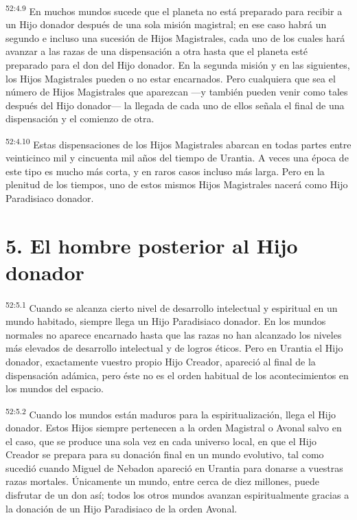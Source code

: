 \par
\textsuperscript{52:4.9} En muchos mundos sucede que el planeta no está preparado para recibir a un Hijo donador después de una sola misión magistral; en ese caso habrá un segundo e incluso una sucesión de Hijos Magistrales, cada uno de los cuales hará avanzar a las razas de una dispensación a otra hasta que el planeta esté preparado para el don del Hijo donador. En la segunda misión y en las siguientes, los Hijos Magistrales pueden o no estar encarnados. Pero cualquiera que sea el número de Hijos Magistrales que aparezcan ---y también pueden venir como tales después del Hijo donador--- la llegada de cada uno de ellos señala el final de una dispensación y el comienzo de otra.

\par
\textsuperscript{52:4.10} Estas dispensaciones de los Hijos Magistrales abarcan en todas partes entre veinticinco mil y cincuenta mil años del tiempo de Urantia. A veces una época de este tipo es mucho más corta, y en raros casos incluso más larga. Pero en la plenitud de los tiempos, uno de estos mismos Hijos Magistrales nacerá como Hijo Paradisiaco donador.

\section*{5. El hombre posterior al Hijo donador}
\par
\textsuperscript{52:5.1} Cuando se alcanza cierto nivel de desarrollo intelectual y espiritual en un mundo habitado, siempre llega un Hijo Paradisiaco donador. En los mundos normales no aparece encarnado hasta que las razas no han alcanzado los niveles más elevados de desarrollo intelectual y de logros éticos. Pero en Urantia el Hijo donador, exactamente vuestro propio Hijo Creador, apareció al final de la dispensación adámica, pero éste no es el orden habitual de los acontecimientos en los mundos del espacio.

\par
\textsuperscript{52:5.2} Cuando los mundos están maduros para la espiritualización, llega el Hijo donador. Estos Hijos siempre pertenecen a la orden Magistral o Avonal salvo en el caso, que se produce una sola vez en cada universo local, en que el Hijo Creador se prepara para su donación final en un mundo evolutivo, tal como sucedió cuando Miguel de Nebadon apareció en Urantia para donarse a vuestras razas mortales. Únicamente un mundo, entre cerca de diez millones, puede disfrutar de un don así; todos los otros mundos avanzan espiritualmente gracias a la donación de un Hijo Paradisiaco de la orden Avonal.

